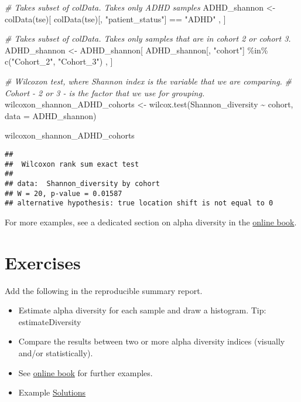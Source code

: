 \documentclass[
  oneside]{book}
\newenvironment{Shaded}{\begin{snugshade}}{\end{snugshade}}
\newcommand{\AttributeTok}[1]{\textcolor[rgb]{0.77,0.63,0.00}{#1}}
\newcommand{\CommentTok}[1]{\textcolor[rgb]{0.56,0.35,0.01}{\textit{#1}}}
\newcommand{\FunctionTok}[1]{\textcolor[rgb]{0.00,0.00,0.00}{#1}}
\newcommand{\NormalTok}[1]{#1}
\newcommand{\OtherTok}[1]{\textcolor[rgb]{0.56,0.35,0.01}{#1}}
\newcommand{\SpecialCharTok}[1]{\textcolor[rgb]{0.00,0.00,0.00}{#1}}
\newcommand{\StringTok}[1]{\textcolor[rgb]{0.31,0.60,0.02}{#1}}
\begin{document}
\begin{Shaded}
\begin{Highlighting}[]
\CommentTok{\# Takes subset of colData. Takes only ADHD samples}
\NormalTok{ADHD\_shannon }\OtherTok{\textless{}{-}} \FunctionTok{colData}\NormalTok{(tse)[ }\FunctionTok{colData}\NormalTok{(tse)[, }\StringTok{"patient\_status"}\NormalTok{] }\SpecialCharTok{==} \StringTok{"ADHD"}\NormalTok{ , ]}

\CommentTok{\# Takes subset of colData. Takes only samples that are in cohort 2 or cohort 3.}
\NormalTok{ADHD\_shannon }\OtherTok{\textless{}{-}}\NormalTok{ ADHD\_shannon[ ADHD\_shannon[, }\StringTok{"cohort"}\NormalTok{] }\SpecialCharTok{\%in\%} \FunctionTok{c}\NormalTok{(}\StringTok{"Cohort\_2"}\NormalTok{, }\StringTok{"Cohort\_3"}\NormalTok{) , ]}

\CommentTok{\# Wilcoxon test, where Shannon index is the variable that we are comparing. }
\CommentTok{\# Cohort {-} 2 or 3 {-} is the factor that we use for grouping. }
\NormalTok{wilcoxon\_shannon\_ADHD\_cohorts }\OtherTok{\textless{}{-}} \FunctionTok{wilcox.test}\NormalTok{(Shannon\_diversity }\SpecialCharTok{\textasciitilde{}}\NormalTok{ cohort, }\AttributeTok{data =}\NormalTok{ ADHD\_shannon)}

\NormalTok{wilcoxon\_shannon\_ADHD\_cohorts}
\end{Highlighting}
\end{Shaded}

\begin{verbatim}
## 
##  Wilcoxon rank sum exact test
## 
## data:  Shannon_diversity by cohort
## W = 20, p-value = 0.01587
## alternative hypothesis: true location shift is not equal to 0
\end{verbatim}

For more examples, see a dedicated section on alpha diversity in the
\href{https://microbiome.github.io/OMA/microbiome-diversity.html\#alpha-diversity}{online book}.

\hypertarget{exercises}{%
\section{Exercises}\label{exercises}}

Add the following in the reproducible summary report.

\begin{itemize}
\item
  Estimate alpha diversity for each sample and draw a histogram. Tip:
  estimateDiversity
\item
  Compare the results between two or more
  alpha diversity indices (visually and/or statistically).
\item
  See \href{https://microbiome.github.io/OMA/microbiome-diversity.html\#alpha-diversity}{online book}
  for further examples.
\item
  Example \href{07-3-ex-sol-ADHD.html}{Solutions}
\end{itemize}
\end{document}
